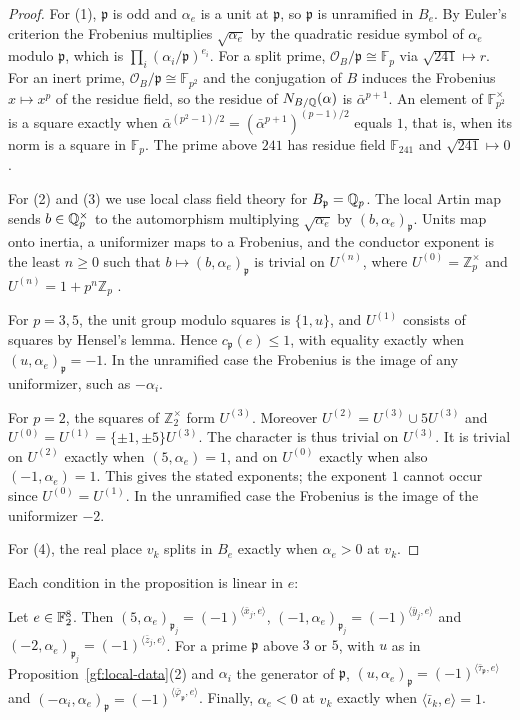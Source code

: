 \begin{proof}
For (1), $\mathfrak p$ is odd and $\alpha_e$ is a unit at $\mathfrak p$, so
$\mathfrak p$ is unramified in $B_e$. By Euler's criterion the Frobenius
multiplies $\sqrt{\alpha_e}$ by the quadratic residue symbol of $\alpha_e$
modulo $\mathfrak p$, which is $\prod_i(\alpha_i/\mathfrak p)^{e_i}$. For a
split prime, $\mathcal O_B/\mathfrak p\cong\mathbb F_p$ via $\sqrt{241}\mapsto
r$. For an inert prime, $\mathcal O_B/\mathfrak p\cong\mathbb F_{p^2}$ and
the conjugation of $B$ induces the Frobenius $x\mapsto x^p$ of the residue
field, so the residue of $N_{B/\mathbb Q}(\alpha)$ is $\bar\alpha^{p+1}$. An element
of $\mathbb F_{p^2}^\times$ is a square exactly when
$\bar\alpha^{(p^2-1)/2}=(\bar\alpha^{p+1})^{(p-1)/2}$ equals $1$, that is,
when its norm is a square in $\mathbb F_p$. The prime above $241$ has
residue field $\mathbb F_{241}$ and $\sqrt{241}\mapsto0$.

For (2) and (3) we use local class field theory for $B_{\mathfrak p}=\mathbb Q_p$.
The local Artin map sends $b\in\mathbb Q_p^\times$ to the automorphism multiplying
$\sqrt{\alpha_e}$ by $(b,\alpha_e)_{\mathfrak p}$. Units map onto inertia, a
uniformizer maps to a Frobenius, and the conductor exponent is the least
$n\ge0$ such that $b\mapsto(b,\alpha_e)_{\mathfrak p}$ is trivial on
$U^{(n)}$, where $U^{(0)}=\mathbb Z_p^\times$ and $U^{(n)}=1+p^n\mathbb Z_p$
\cite{MilneCFT}.

For $p=3,5$, the unit group modulo squares is $\{1,u\}$, and $U^{(1)}$
consists of squares by Hensel's lemma. Hence $c_{\mathfrak p}(e)\le1$, with
equality exactly when $(u,\alpha_e)_{\mathfrak p}=-1$. In the unramified
case the Frobenius is the image of any uniformizer, such as $-\alpha_i$.

For $p=2$, the squares of $\mathbb Z_2^\times$ form $U^{(3)}$. Moreover
$U^{(2)}=U^{(3)}\cup5U^{(3)}$ and
$U^{(0)}=U^{(1)}=\{\pm1,\pm5\}U^{(3)}$. The character is thus trivial on
$U^{(3)}$. It is trivial on $U^{(2)}$ exactly when $(5,\alpha_e)=1$, and
on $U^{(0)}$ exactly when also $(-1,\alpha_e)=1$. This gives the stated
exponents; the exponent $1$ cannot occur since $U^{(0)}=U^{(1)}$. In the
unramified case the Frobenius is the image of the uniformizer $-2$.

For (4), the real place $v_k$ splits in $B_e$ exactly when $\alpha_e>0$ at
$v_k$.
\end{proof}

Each condition in the proposition is linear in $e$:

\begin{lemma}\label{gf:linear}
Let $e\in\mathbb F_2^8$. Then
$(5,\alpha_e)_{\mathfrak p_j}=(-1)^{\langle\bar x_j,e\rangle}$,
$(-1,\alpha_e)_{\mathfrak p_j}=(-1)^{\langle\bar y_j,e\rangle}$ and
$(-2,\alpha_e)_{\mathfrak p_j}=(-1)^{\langle\bar z_j,e\rangle}$. For a prime
$\mathfrak p$ above $3$ or $5$, with $u$ as in
Proposition~\ref{gf:local-data}(2) and $\alpha_i$ the generator of
$\mathfrak p$,
$(u,\alpha_e)_{\mathfrak p}=(-1)^{\langle\bar\tau_{\mathfrak p},e\rangle}$ and
$(-\alpha_i,\alpha_e)_{\mathfrak p}=(-1)^{\langle\bar\varphi_{\mathfrak p},e\rangle}$.
Finally, $\alpha_e<0$ at $v_k$ exactly when $\langle\bar\iota_k,e\rangle=1$.
\end{lemma}

